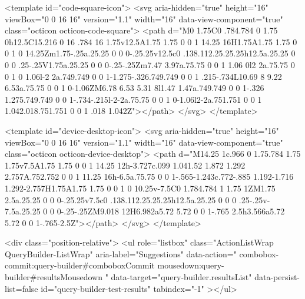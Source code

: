 {{<template id="code-square-icon">
  <svg aria-hidden="true" height="16" viewBox="0 0 16 16" version="1.1" width="16" data-view-component="true" class="octicon octicon-code-square">
    <path d="M0 1.75C0 .784.784 0 1.75 0h12.5C15.216 0 16 .784 16 1.75v12.5A1.75 1.75 0 0 1 14.25 16H1.75A1.75 1.75 0 0 1 0 14.25Zm1.75-.25a.25.25 0 0 0-.25.25v12.5c0 .138.112.25.25.25h12.5a.25.25 0 0 0 .25-.25V1.75a.25.25 0 0 0-.25-.25Zm7.47 3.97a.75.75 0 0 1 1.06 0l2 2a.75.75 0 0 1 0 1.06l-2 2a.749.749 0 0 1-1.275-.326.749.749 0 0 1 .215-.734L10.69 8 9.22 6.53a.75.75 0 0 1 0-1.06ZM6.78 6.53 5.31 8l1.47 1.47a.749.749 0 0 1-.326 1.275.749.749 0 0 1-.734-.215l-2-2a.75.75 0 0 1 0-1.06l2-2a.751.751 0 0 1 1.042.018.751.751 0 0 1 .018 1.042Z"></path>
</svg>
</template>

<template id="device-desktop-icon">
  <svg aria-hidden="true" height="16" viewBox="0 0 16 16" version="1.1" width="16" data-view-component="true" class="octicon octicon-device-desktop">
    <path d="M14.25 1c.966 0 1.75.784 1.75 1.75v7.5A1.75 1.75 0 0 1 14.25 12h-3.727c.099 1.041.52 1.872 1.292 2.757A.752.752 0 0 1 11.25 16h-6.5a.75.75 0 0 1-.565-1.243c.772-.885 1.192-1.716 1.292-2.757H1.75A1.75 1.75 0 0 1 0 10.25v-7.5C0 1.784.784 1 1.75 1ZM1.75 2.5a.25.25 0 0 0-.25.25v7.5c0 .138.112.25.25.25h12.5a.25.25 0 0 0 .25-.25v-7.5a.25.25 0 0 0-.25-.25ZM9.018 12H6.982a5.72 5.72 0 0 1-.765 2.5h3.566a5.72 5.72 0 0 1-.765-2.5Z"></path>
</svg>
</template>

        <div class="position-relative">
                        <ul
              role="listbox"
              class="ActionListWrap QueryBuilder-ListWrap"
              aria-label="Suggestions"
              data-action="
                combobox-commit:query-builder#comboboxCommit
                mousedown:query-builder#resultsMousedown
              "
              data-target="query-builder.resultsList"
              data-persist-list=false
              id="query-builder-test-results"
              tabindex="-1"
            ></ul>

}}
